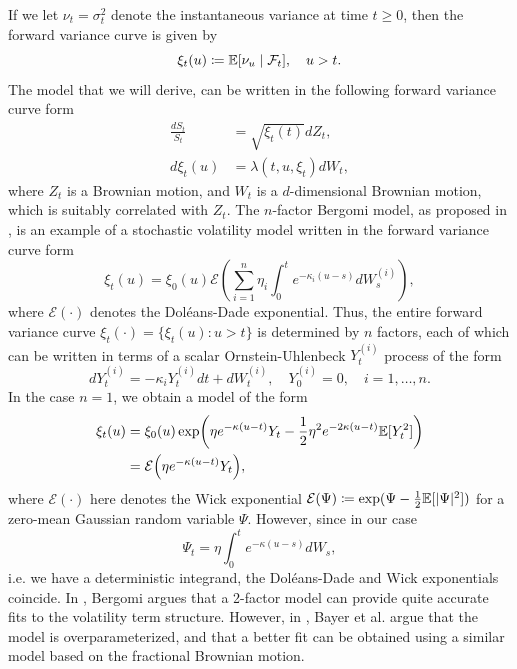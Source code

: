 If we let $\nu_{t}=\sigma_{t}^{2}$ denote the instantaneous variance at time $t\geq 0$, then the forward variance curve is given by
\begin{equation}
    \xi_{t}(u)\coloneqq \mathbb{E}[\nu_{u} \mid\mathcal{F}_{t}], \quad u > t.
\end{equation}
The model that we will derive, can be written in the following forward variance curve form
\begin{align}
    \frac{dS_{t}}{S_{t}}&= \sqrt{\xi_{t}(t)}dZ_{t}, \\
    d\xi_{t}(u)&= \lambda(t,u,\xi_{t})dW_{t},
\end{align}
where $Z_{t}$ is a Brownian motion, and $W_{t}$ is a $d$-dimensional Brownian motion, which is suitably correlated with $Z_{t}$. The $n$-factor Bergomi model, as proposed in \cite{bergomi}, is an example of a stochastic volatility model written in the forward variance curve form
\begin{equation}\label{eq:bergomi}
    \xi_{t}(u)=\xi_{0}(u)\mathcal{E}\left(\sum_{i=1}^{n}\eta_{i}\int_{0}^{t}e^{-\kappa_{i}(u-s)}dW_{s}^{(i)}\right),
\end{equation}
where $\mathcal{E}(\cdot)$ denotes the Doléans-Dade exponential. Thus, the entire forward variance curve $\xi_{t}(\cdot)=\{\xi_{t}(u) : u>t\}$ is determined by $n$ factors, each of which can be written in terms of a scalar Ornstein-Uhlenbeck $Y_{t}^{(i)}$ process of the form
\begin{equation}
    dY^{(i)}_{t}=-\kappa_{i} Y_{t}^{(i)}dt + dW^{(i)}_{t},\quad Y_{0}^{(i)}=0,\quad i=1,\dots,n.
\end{equation}
In the case $n=1$, we obtain a model of the form
\begin{align}
    \xi_{t}(u)&=\xi_{0}(u)\exp\left(\eta e^{-\kappa(u-t)}Y_{t}- \frac{1}{2}\eta^{2}e^{-2\kappa(u-t)}\E[Y_{t}^{2}]\right)\\
    &= \mathcal{E}\left(\eta e^{-\kappa(u-t)}Y_{t}\right),
\end{align}
where  $\mathcal{E}(\cdot)$ here denotes the Wick exponential $\mathcal{E}(\Psi)\coloneqq \exp(\Psi - \frac{1}{2}\mathbb{E}[|\Psi|^{2}])$ for a zero-mean Gaussian random variable $\Psi$. However, since in our case
\begin{equation}
    \Psi_{t} = \eta \int_{0}^{t}e^{-\kappa(u-s)}dW_{s},
\end{equation}
i.e. we have a deterministic integrand, the Doléans-Dade and Wick exponentials coincide. In \cite{bergomi}, Bergomi argues that a 2-factor model can provide quite accurate fits to the volatility term structure. However, in \cite{pricing}, Bayer et al. argue that the model is overparameterized, and that a better fit can be obtained using a similar model based on the fractional Brownian motion.

